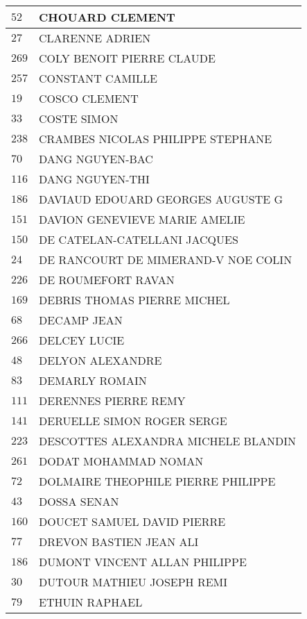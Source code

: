 \begin{xltabular}{\linewidth}{|l|X|}
    \hline
    $52$ & CHOUARD CLEMENT \\
    \hline
    $27$ & CLARENNE ADRIEN \\
    \hline
    $269$ & COLY BENOIT PIERRE CLAUDE \\
    \hline
    $257$ & CONSTANT CAMILLE \\
    \hline
    $19$ & COSCO CLEMENT \\
    \hline
    $33$ & COSTE SIMON \\
    \hline
    $238$ & CRAMBES NICOLAS PHILIPPE STEPHANE \\
    \hline
    $70$ & DANG NGUYEN-BAC \\
    \hline
    $116$ & DANG NGUYEN-THI \\
    \hline
    $186$ & DAVIAUD EDOUARD GEORGES AUGUSTE G \\
    \hline
    $151$ & DAVION GENEVIEVE MARIE AMELIE \\
    \hline
    $150$ & DE CATELAN-CATELLANI JACQUES \\
    \hline
    $24$ & DE RANCOURT DE MIMERAND-V NOE COLIN \\
    \hline
    $226$ & DE ROUMEFORT RAVAN \\
    \hline
    $169$ & DEBRIS THOMAS PIERRE MICHEL \\
    \hline
    $68$ & DECAMP JEAN \\
    \hline
    $266$ & DELCEY LUCIE \\
    \hline
    $48$ & DELYON ALEXANDRE \\
    \hline
    $83$ & DEMARLY ROMAIN \\
    \hline
    $111$ & DERENNES PIERRE REMY \\
    \hline
    $141$ & DERUELLE SIMON ROGER SERGE \\
    \hline
    $223$ & DESCOTTES ALEXANDRA MICHELE BLANDIN \\
    \hline
    $261$ & DODAT MOHAMMAD NOMAN \\
    \hline
    $72$ & DOLMAIRE THEOPHILE PIERRE PHILIPPE \\
    \hline
    $43$ & DOSSA SENAN \\
    \hline
    $160$ & DOUCET SAMUEL DAVID PIERRE \\
    \hline
    $77$ & DREVON BASTIEN JEAN ALI \\
    \hline
    $186$ & DUMONT VINCENT ALLAN PHILIPPE \\
    \hline
    $30$ & DUTOUR MATHIEU JOSEPH REMI \\
    \hline
    $79$ & ETHUIN RAPHAEL \\

\end{xltabular}
